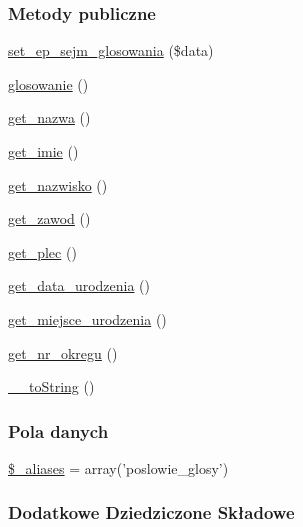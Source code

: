 \subsubsection*{Metody publiczne}
\begin{DoxyCompactItemize}
\item 
\hyperlink{classep___posel___glos_a7dcb564db1d48eef20ad98cfaaddb4b7}{set\-\_\-ep\-\_\-sejm\-\_\-glosowania} (\$data)
\item 
\hyperlink{classep___posel___glos_aa9c48ea23fb8c76dd004f67b72fd4d90}{glosowanie} ()
\item 
\hyperlink{classep___posel___glos_ac0818f0049d7b84f08f77128f54cee36}{get\-\_\-nazwa} ()
\item 
\hyperlink{classep___posel___glos_ac4b0c85dc2a130038f2d118dbd0c3d77}{get\-\_\-imie} ()
\item 
\hyperlink{classep___posel___glos_abdd1d7ff92508da7f748ba1feec97af0}{get\-\_\-nazwisko} ()
\item 
\hyperlink{classep___posel___glos_af80ca8310b60004454dd02a387deaa2c}{get\-\_\-zawod} ()
\item 
\hyperlink{classep___posel___glos_ac7f9af5c3fa024e4c26a7b6bd4ce4bb4}{get\-\_\-plec} ()
\item 
\hyperlink{classep___posel___glos_a880b240cd2d8c336fd1709bf0cb1ae2c}{get\-\_\-data\-\_\-urodzenia} ()
\item 
\hyperlink{classep___posel___glos_ac57c08ec5e394a19c5bd9280c8376182}{get\-\_\-miejsce\-\_\-urodzenia} ()
\item 
\hyperlink{classep___posel___glos_a2645a9f0aa5b0ccc482943348c033d0a}{get\-\_\-nr\-\_\-okregu} ()
\item 
\hyperlink{classep___posel___glos_a7516ca30af0db3cdbf9a7739b48ce91d}{\-\_\-\-\_\-to\-String} ()
\end{DoxyCompactItemize}
\subsubsection*{Pola danych}
\begin{DoxyCompactItemize}
\item 
\hyperlink{classep___posel___glos_ab4e31d75f0bc5d512456911e5d01366b}{\$\-\_\-aliases} = array('poslowie\-\_\-glosy')
\end{DoxyCompactItemize}
\subsubsection*{Dodatkowe Dziedziczone Składowe}


